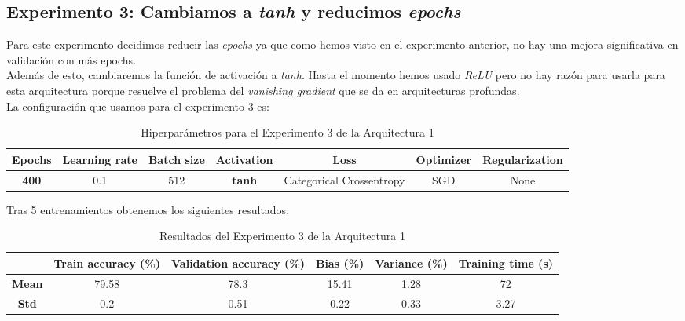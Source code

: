 \documentclass{article}
\begin{document}
		\subsection{Experimento 3: Cambiamos a \textit{tanh} y reducimos \textit{epochs}}
		\label{d-s-a1-e3}
			Para este experimento decidimos reducir las \textit{epochs} ya que como hemos visto en el experimento anterior, no hay una mejora significativa en validaci\'on con m\'as epochs.\\
			Adem\'as de esto, cambiaremos la funci\'on de activaci\'on a \textit{tanh}. Hasta el momento hemos usado \textit{ReLU} pero no hay raz\'on para usarla para esta arquitectura porque resuelve el problema del \textit{vanishing gradient} que se da en arquitecturas profundas.\\
			La configuraci\'on que usamos para el experimento 3 es:
			\begin{table}[!h]
				\begin{center}
					\begin{tabular}{| c | c | c | c | c | c | c |}
						\textbf{Epochs} & \textbf{Learning rate} & \textbf{Batch size} & \textbf{Activation} & \textbf{Loss} & \textbf{Optimizer} & \textbf{Regularization} \\ \hline
						\textbf{400} & 0.1 & 512 & \textbf{tanh} & Categorical Crossentropy & SGD & None
					\end{tabular}
					\caption{Hiperpar\'ametros para el Experimento 3 de la Arquitectura 1}
					\label{tab:hip-d-a1-e3}
				\end{center}
			\end{table}
			
			Tras 5 entrenamientos obtenemos los siguientes resultados:
			\begin{table}[!h]
				\begin{center}
					\begin{tabular}{ c | c | c | c | c | c |}
						\ & \textbf{Train accuracy (\%)} & \textbf{Validation accuracy (\%)} & \textbf{Bias (\%)} & \textbf{Variance (\%)} & \textbf{Training time (s)} \\ \hline
						\textbf{Mean} & 79.58 & 78.3 & 15.41 & 1.28 & 72\\ \hline
						\textbf{Std} & 0.2 & 0.51 & 0.22 & 0.33 & 3.27 \\ \hline
					\end{tabular}
					\caption{Resultados del Experimento 3 de la Arquitectura 1}
					\label{tab:res-d-a1-e3}
				\end{center}
			\end{table}
			
\end{document}
